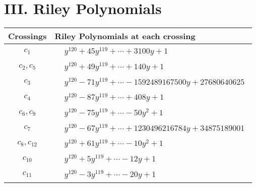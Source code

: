 \documentclass[1p]{elsarticle_modified}
\theoremstyle{definition}
\begin{document}
\centering \section*{ III. Riley Polynomials}
\begin{tabular}{m{50pt}|m{274pt}}
Crossings & \hspace{64pt}Riley Polynomials at each crossing \\
\hline $$\begin{aligned}c_{1}\end{aligned}$$&$\begin{aligned}
&y^{120}+45 y^{119}+\cdots+3100 y+1
\end{aligned}$\\
\hline $$\begin{aligned}c_{2},c_{5}\end{aligned}$$&$\begin{aligned}
&y^{120}+49 y^{119}+\cdots+140 y+1
\end{aligned}$\\
\hline $$\begin{aligned}c_{3}\end{aligned}$$&$\begin{aligned}
&y^{120}-71 y^{119}+\cdots-1592489167500 y+27680640625
\end{aligned}$\\
\hline $$\begin{aligned}c_{4}\end{aligned}$$&$\begin{aligned}
&y^{120}-87 y^{119}+\cdots+408 y+1
\end{aligned}$\\
\hline $$\begin{aligned}c_{6},c_{9}\end{aligned}$$&$\begin{aligned}
&y^{120}-75 y^{119}+\cdots-50 y^2+1
\end{aligned}$\\
\hline $$\begin{aligned}c_{7}\end{aligned}$$&$\begin{aligned}
&y^{120}-67 y^{119}+\cdots+1230496216784 y+34875189001
\end{aligned}$\\
\hline $$\begin{aligned}c_{8},c_{12}\end{aligned}$$&$\begin{aligned}
&y^{120}+61 y^{119}+\cdots-10 y^2+1
\end{aligned}$\\
\hline $$\begin{aligned}c_{10}\end{aligned}$$&$\begin{aligned}
&y^{120}+5 y^{119}+\cdots-12 y+1
\end{aligned}$\\
\hline $$\begin{aligned}c_{11}\end{aligned}$$&$\begin{aligned}
&y^{120}-3 y^{119}+\cdots-20 y+1
\end{aligned}$\\
\hline
\end{tabular}
\vskip 2pc
\end{document}
